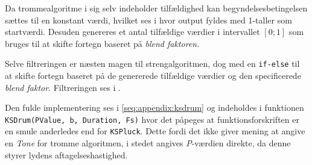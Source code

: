 Da trommealgoritme i sig selv indeholder tilfældighed kan begyndelsesbetingelsen sættes til en konstant værdi, hvilket ses i  hvor output fyldes med 1-taller som startværdi.
Desuden genereres et antal tilfældige værdier i intervallet \([0; 1]\) som bruges til at skifte fortegn baseret på \textit{blend faktoren}.


Selve filtreringen er næsten magen til strengalgoritmen, dog med en \texttt{if-else} til at skifte fortegn baseret på de genererede tilfældige værdier og den specificerede \textit{blend faktor}.
Filtreringen ses i .


Den fulde implementering ses i \ref{seq:appendix:ksdrum} og indeholdes i funktionen \texttt{KSDrum(PValue, b, Duration, Fs)} hvor det påpeges at funktionsforskriften er en smule anderledes end for \texttt{KSPluck}.
Dette fordi det ikke giver mening at angive en \textit{Tone} for tromme algoritmen, i stedet angives \textit{P}-værdien direkte, da denne styrer lydens aftagelseshastighed.